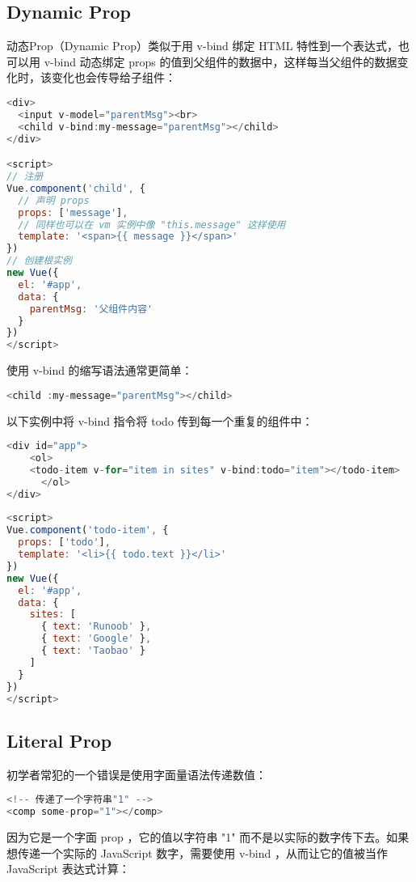 \subsection{Dynamic Prop}



动态Prop（Dynamic Prop）类似于用 v-bind 绑定 HTML 特性到一个表达式，也可以用 v-bind 动态绑定 props 的值到父组件的数据中，这样每当父组件的数据变化时，该变化也会传导给子组件：

\begin{lstlisting}[language=JavaScript]
<div>
  <input v-model="parentMsg"><br>
  <child v-bind:my-message="parentMsg"></child>
</div>

<script>
// 注册
Vue.component('child', {
  // 声明 props
  props: ['message'],
  // 同样也可以在 vm 实例中像 "this.message" 这样使用
  template: '<span>{{ message }}</span>'
})
// 创建根实例
new Vue({
  el: '#app',
  data: {
    parentMsg: '父组件内容'
  }
})
</script>
\end{lstlisting}

使用 v-bind 的缩写语法通常更简单：

\begin{lstlisting}[language=JavaScript]
<child :my-message="parentMsg"></child>
\end{lstlisting}

以下实例中将 v-bind 指令将 todo 传到每一个重复的组件中：

\begin{lstlisting}[language=JavaScript]
<div id="app">
    <ol>
    <todo-item v-for="item in sites" v-bind:todo="item"></todo-item>
      </ol>
</div>
 
<script>
Vue.component('todo-item', {
  props: ['todo'],
  template: '<li>{{ todo.text }}</li>'
})
new Vue({
  el: '#app',
  data: {
    sites: [
      { text: 'Runoob' },
      { text: 'Google' },
      { text: 'Taobao' }
    ]
  }
})
</script>
\end{lstlisting}

\subsection{Literal Prop}


初学者常犯的一个错误是使用字面量语法传递数值：

\begin{lstlisting}[language=JavaScript]
<!-- 传递了一个字符串"1" -->
<comp some-prop="1"></comp>
\end{lstlisting}


因为它是一个字面 prop ，它的值以字符串 "1" 而不是以实际的数字传下去。如果想传递一个实际的 JavaScript 数字，需要使用 v-bind ，从而让它的值被当作 JavaScript 表达式计算：



